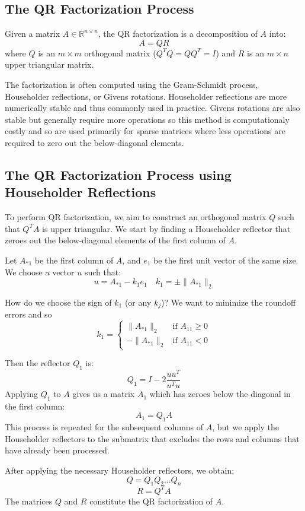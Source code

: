 \subsection{The QR Factorization Process}

Given a matrix $A \in \mathbb{R}^{n \times n}$, the QR factorization is a decomposition of $A$ into:
\begin{equation*}
    A = QR
\end{equation*}
where $Q$ is an $m \times m$ orthogonal matrix ($Q^TQ = QQ^T = I$) and $R$ is an $m \times n$ upper triangular matrix.

The factorization is often computed using the Gram-Schmidt process, Householder reflections, or Givens rotations.
Householder reflections are more numerically stable and thus commonly used in practice.
Givens rotations are also stable but generally require more operations so this method is computationaly costly
and so are used primarily for sparse matrices where less operations are required to zero out the below-diagonal elements.
\subsection{The QR Factorization Process using Householder Reflections}
To perform QR factorization, we aim to construct an orthogonal matrix $Q$ such that $Q^TA$ is upper triangular. We start by finding a Householder reflector that zeroes out the below-diagonal elements of the first column of $A$.

Let $A_{*1}$ be the first column of $A$, and $e_1$ be the first unit vector of the same size. We choose a vector $u$ such that:
\begin{equation*}
    u = A_{*1} - k_1e_1 \quad k_1 = \pm \|A_{*1}\|_2
\end{equation*}

\begin{mdframed}
How do we choose the sign of $k_1$ (or any $k_j$)? We want to minimize the roundoff errors and so
\[
k_1 = \begin{cases}
    \|A_{*1}\|_2 & \text{if } A_{11} \geq 0 \\
    -\|A_{*1}\|_2 & \text{if } A_{11} < 0
\end{cases}
\]
\end{mdframed}

Then the reflector $Q_1$ is:
\begin{equation*}
    Q_1 = I - 2\frac{uu^T}{u^Tu}
\end{equation*}
Applying $Q_1$ to $A$ gives us a matrix $A_1$ which has zeroes below the diagonal in the first column:
\begin{equation*}
    A_1 = Q_1A
\end{equation*}
This process is repeated for the subsequent columns of $A$, but we apply the Householder reflectors to the submatrix that excludes the rows and columns that have already been processed.

After applying the necessary Householder reflectors, we obtain:
\begin{equation*}
    Q = Q_1Q_2...Q_n
\end{equation*}
\begin{equation*}
    R = Q^TA
\end{equation*}
The matrices $Q$ and $R$ constitute the QR factorization of $A$.


